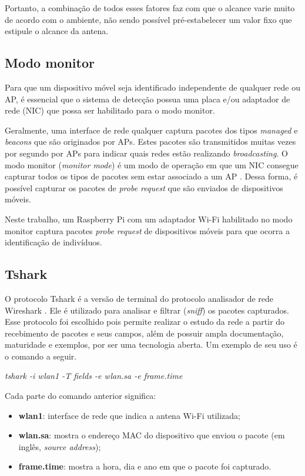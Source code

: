 Portanto, a combinação de todos esses fatores faz com que o alcance varie muito de acordo com o ambiente, não sendo possível pré-estabelecer um valor fixo que estipule o alcance da antena.

\subsection{Modo monitor}
\label{modo-monitor}
Para que um dispositivo móvel seja identificado independente de qualquer rede ou AP, é essencial que o sistema de detecção possua uma placa e/ou adaptador de rede (NIC) que possa ser habilitado para o modo monitor.

Geralmente, uma interface de rede qualquer captura pacotes dos tipos \emph{managed} e \emph{beacons} que são originados por APs. Estes pacotes são transmitidos
muitas vezes por segundo por APs para indicar quais redes estão realizando \emph{broadcasting}. O modo monitor (\emph{monitor mode}) é um modo de operação em que um NIC consegue capturar todos os tipos de pacotes sem estar associado a um AP \cite{Acrylic} \cite{Wireshark2017b}. Dessa forma, é possível capturar os pacotes de \emph{probe request} que são enviados de dispositivos móveis.

Neste trabalho, um Raspberry Pi com um adaptador Wi-Fi habilitado no modo monitor captura pacotes \emph{probe request} de dispositivos móveis
para que ocorra a identificação de indivíduos.

\subsection{Tshark}
\label{tshark-section}
O protocolo Tshark é a versão de terminal do protocolo
analisador de rede Wireshark \cite{Wireshark2017} \cite{Wireshark2017a}. Ele é
utilizado para analisar e filtrar (\emph{sniff}) os
pacotes capturados. Esse protocolo foi
escolhido pois permite realizar o estudo da rede a partir do recebimento de
pacotes e seus campos, além de possuir ampla documentação, maturidade e exemplos, por ser uma tecnologia aberta. Um exemplo de seu uso é o comando a seguir.

\begin{center}
\emph{tshark -i wlan1 -T fields -e wlan.sa -e frame.time}
\end{center}

Cada parte do comando anterior significa:
\begin{itemize}
  \item \textbf{wlan1}: interface de rede que indica a antena Wi-Fi utilizada;
  \item \textbf{wlan.sa}: mostra o endereço MAC do dispositivo que enviou o pacote (em inglês, \emph{source address});
  \item \textbf{frame.time}: mostra a hora, dia e ano em que o pacote foi capturado.
\end{itemize}

